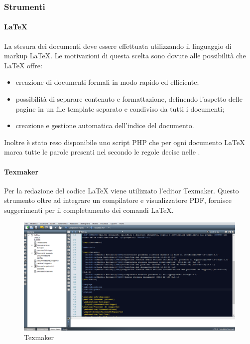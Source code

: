 \subsubsection{Strumenti}
\label{sec:Strumenti}
 \paragraph{\LaTeX}
La stesura dei documenti deve essere effettuata utilizzando il linguaggio di markup \LaTeX. Le motivazioni di questa scelta sono dovute alle possibilità che \LaTeX{} offre:
\begin{itemize}
	\item creazione di documenti formali in modo rapido ed efficiente;
	\item possibilità di separare contenuto e formattazione, definendo l'aspetto delle pagine in un file
template separato e condiviso da tutti i documenti;
	\item creazione e gestione automatica dell'indice del documento.
\end{itemize}
Inoltre è stato reso disponibile uno script PHP che per ogni documento \LaTeX{} marca tutte  le parole presenti nel \Gldoc{} secondo le regole decise nelle \NPdoc.
 \paragraph{Texmaker}
Per la redazione del codice \LaTeX{} viene utilizzato l'editor Texmaker. Questo
strumento oltre ad integrare un compilatore e visualizzatore PDF, fornisce suggerimenti per il completamento dei comandi \LaTeX.
\begin{figure}[h]
\centering
\includegraphics[scale=0.3]{img/texm.png}
\caption{Texmaker}\label{sec:Figura2}
\end{figure}
